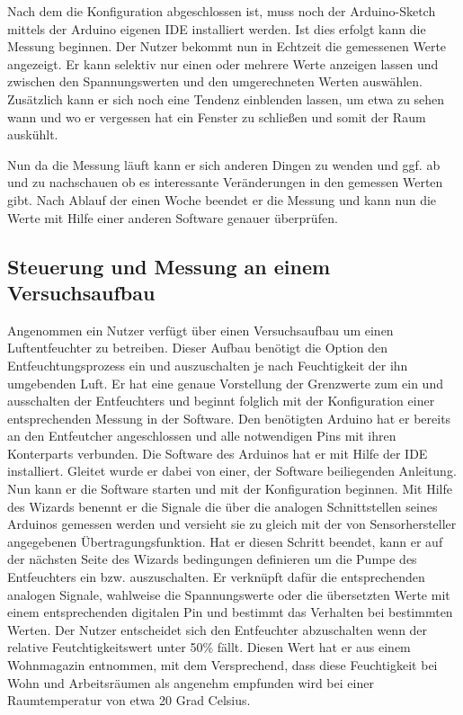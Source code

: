 Nach dem die Konfiguration abgeschlossen ist, muss noch der Arduino-Sketch mittels der Arduino eigenen IDE installiert werden. Ist dies erfolgt kann die Messung beginnen. Der Nutzer bekommt nun in Echtzeit die gemessenen Werte angezeigt. Er kann selektiv nur einen oder mehrere Werte anzeigen lassen und zwischen den Spannungswerten und den umgerechneten Werten auswählen. Zusätzlich kann er sich noch eine Tendenz einblenden lassen, um etwa zu sehen wann und wo er vergessen hat ein Fenster zu schließen und somit der Raum auskühlt. 

Nun da die Messung läuft kann er sich anderen Dingen zu wenden und ggf. ab und zu nachschauen ob es interessante Veränderungen in den gemessen Werten gibt.
Nach Ablauf der einen Woche beendet er die Messung und kann nun die Werte mit Hilfe einer anderen Software genauer überprüfen.
\subsection{Steuerung und Messung an einem Versuchsaufbau}
Angenommen ein Nutzer verfügt über einen Versuchsaufbau um einen Luftentfeuchter zu betreiben. Dieser Aufbau benötigt die Option den Entfeuchtungsprozess ein und auszuschalten je nach Feuchtigkeit der ihn umgebenden Luft. Er hat eine genaue Vorstellung der Grenzwerte zum ein und ausschalten der Entfeuchters und beginnt folglich mit der Konfiguration einer entsprechenden Messung in der Software. Den benötigten Arduino hat er bereits an den Entfeutcher angeschlossen und alle notwendigen Pins mit ihren Konterparts verbunden. Die Software des Arduinos hat er mit Hilfe der IDE installiert. Gleitet wurde er dabei von einer, der Software beiliegenden Anleitung. Nun kann er die Software starten und mit der Konfiguration beginnen.
Mit Hilfe des Wizards benennt er die Signale die über die analogen Schnittstellen seines Arduinos gemessen werden und versieht sie zu gleich mit der von Sensorhersteller angegebenen Übertragungsfunktion. Hat er diesen Schritt beendet, kann er auf der nächsten Seite des Wizards bedingungen definieren um die Pumpe des Entfeuchters ein bzw. auszuschalten. Er verknüpft dafür die entsprechenden analogen Signale, wahlweise die Spannungswerte oder die übersetzten Werte mit einem entsprechenden digitalen Pin und bestimmt das Verhalten bei bestimmten Werten. Der Nutzer entscheidet sich den Entfeuchter abzuschalten wenn der relative Feutchtigkeitswert unter 50\% fällt. Diesen Wert hat er aus einem Wohnmagazin entnommen, mit dem Versprechend, dass diese Feuchtigkeit bei Wohn und Arbeitsräumen als angenehm empfunden wird bei einer Raumtemperatur von etwa 20 Grad Celsius. 

